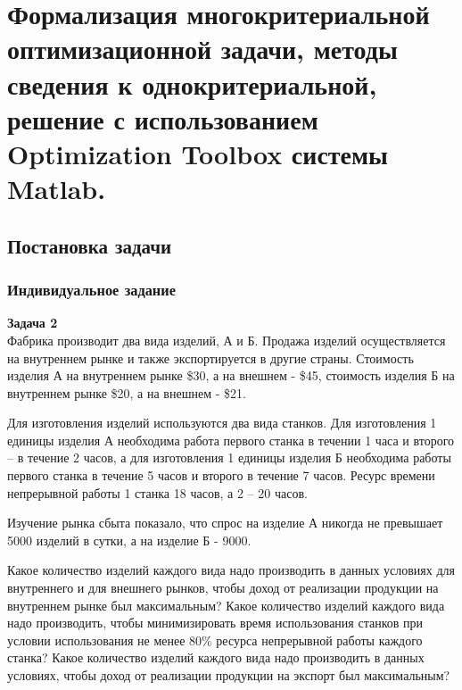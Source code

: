 \chapter{Формализация многокритериальной оптимизационной задачи, методы сведения к однокритериальной, решение с использованием Optimization Toolbox системы Matlab.}
\section{Постановка задачи}
\subsection{Индивидуальное задание}
\textbf{Задача 2}\\
Фабрика производит два вида изделий, А и Б. Продажа изделий осуществляется на внутреннем рынке и также экспортируется в другие страны. Стоимость изделия А на внутреннем рынке \$30, а на внешнем - \$45, стоимость изделия Б на внутреннем рынке \$20, а на внешнем - \$21.

Для изготовления изделий используются два вида станков. Для изготовления 1 единицы изделия А необходима работа первого станка в течении 1 часа и второго – в течение 2 часов, а для изготовления 1 единицы изделия Б необходима работы первого станка в течение 5 часов и второго в течение 7 часов. Ресурс времени непрерывной работы 1 станка 18 часов, а 2 – 20 часов. 

Изучение рынка сбыта показало, что спрос на изделие А никогда не превышает 5000 изделий в сутки, а на изделие Б - 9000. 

Какое количество изделий каждого вида надо производить в  данных условиях для внутреннего и для внешнего рынков, чтобы доход от реализации продукции на внутреннем рынке был максимальным?  Какое количество изделий каждого вида надо производить, чтобы минимизировать время использования станков при  условии использования не менее 80\% ресурса непрерывной работы каждого станка? Какое количество изделий каждого вида надо производить в  данных условиях, чтобы доход от реализации продукции на экспорт был максимальным?

